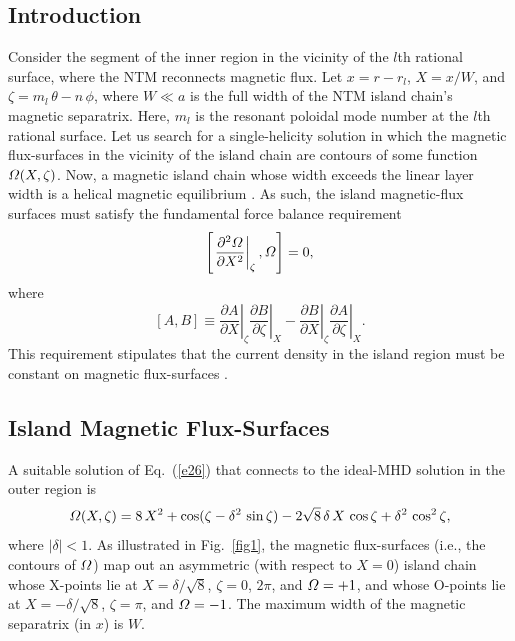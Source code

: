\documentclass{iopjournal}
\begin{document}
\subsection{Introduction}
Consider the segment of the inner region in the vicinity of the $l$th rational surface, where the NTM reconnects magnetic flux. 
Let $x=r-r_{l}$, $X=x/W$, and $\zeta=m_{l}\,\theta-n\,\phi$, where $W\ll a$ is the full width  of the NTM island chain's magnetic separatrix. 
Here, $m_l$ is the resonant poloidal mode number at the $l$th rational surface. 
Let us search for a single-helicity solution in which the magnetic flux-surfaces in the vicinity of the island chain are contours of some function ${\mit\Omega}(X,\zeta)$.
Now, a magnetic island chain whose width exceeds the linear layer width is a helical magnetic equilibrium \cite{ntm1}. As such, the island magnetic-flux surfaces must satisfy the fundamental
force balance requirement \cite{island}
\begin{equation}\label{e26}
\left[\left.\frac{\partial^2{\mit\Omega}}{\partial X^2}\right|_\zeta,{\mit\Omega}\right]=0,
\end{equation}
where
\begin{equation}\label{poisson}
[A,B] \equiv \left.\frac{\partial A}{\partial X}\right|_\zeta \left.\frac{\partial B}{\partial\zeta}\right|_X- \left.\frac{\partial B}{\partial X}\right|_\zeta \left.\frac{\partial A}{\partial\zeta}\right|_X.
\end{equation}
This requirement stipulates that the current density in the island region must be constant on magnetic flux-surfaces \cite{ntm1,multi}.

\subsection{Island Magnetic Flux-Surfaces}
A suitable solution of Eq.~(\ref{e26}) that connects to the ideal-MHD solution in the outer region is \cite{island}
\begin{equation}\label{e45}
{\mit\Omega}(X,\zeta) = 8\,X^2 + \cos(\zeta-\delta^2\,\sin\zeta) - 2\sqrt{8}\,\delta\,X\,\cos\zeta+\delta^2\,\cos^2\zeta,
\end{equation}
where $|\delta|<1$.  As illustrated in Fig.~\ref{fig1}, the magnetic flux-surfaces  (i.e., the contours of ${\mit\Omega}$) map out an
asymmetric (with respect to $X=0$) island chain whose 
X-points lie at $X=\delta/\sqrt{8}$, $\zeta = 0$, $2\pi$, and ${\mit\Omega}=+1$,  and whose  O-points lie at
$X=-\delta/\sqrt{8}$,  $\zeta=\pi$, and ${\mit\Omega}=-1$. The maximum width of the magnetic separatrix (in $x$) is $W$. 
\end{document}
